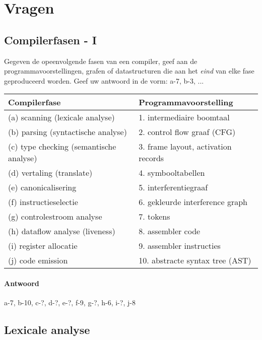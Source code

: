\documentclass{report}
\newcommand{\answer}[1]{
		\subsubsection*{Antwoord}
			#1
}
\begin{document}
	\tableofcontents
	\chapter{Vragen}
	\section{Compilerfasen - I}
	Gegeven de opeenvolgende fasen van een compiler, geef aan de programmavoorstellingen, grafen of datastructuren die aan het \textit{eind} van elke fase geproduceerd worden. Geef uw antwoord in de vorm: a-7, b-3, ...
	\begin{table}[ht]
		\begin{tabular}{l l}
			\hline
			Compilerfase & Programmavoorstelling \\
			\hline 
			(a) scanning (lexicale analyse) & 1.  intermediaire boomtaal \\
			(b) parsing  (syntactische analyse) & 2.  control flow graaf (CFG) \\
			(c) type checking (semantische analyse) & 3.  frame layout, activation records \\
			(d) vertaling (translate) & 4.  symbooltabellen \\
			(e) canonicalisering & 5.  interferentiegraaf \\
			(f) instructieselectie & 6.  gekleurde interference graph \\
			(g) controlestroom analyse & 7.  tokens \\
			(h) dataflow analyse (liveness) & 8.  assembler code \\
			(i) register allocatie & 9.  assembler instructies \\
			(j) code emission & 10.  abstracte syntax tree (AST)
		\end{tabular}
	\end{table}

	\answer{a-7, b-10, c-?, d-?, e-?, f-9, g-?, h-6, i-?, j-8}

	\newpage
	\section{Lexicale analyse}
	\label{sec:lexicale_analyse}
	
\end{document}
